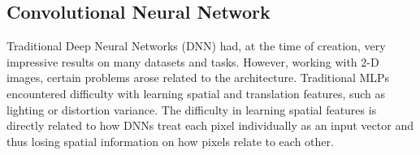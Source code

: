 \documentclass[oneside, english, bibtex]{kththesis}
\begin{document}







\subsection{Convolutional Neural Network}

Traditional Deep Neural Networks (DNN) had, at the time of creation, very impressive results on many datasets and tasks. However, working with 2-D images, certain problems arose related to the architecture. Traditional MLPs encountered difficulty with learning spatial and translation features, such as lighting or distortion variance. The difficulty in learning spatial features is directly related to how DNNs treat each pixel individually as an input vector and thus losing spatial information on how pixels relate to each other.
\end{document}
